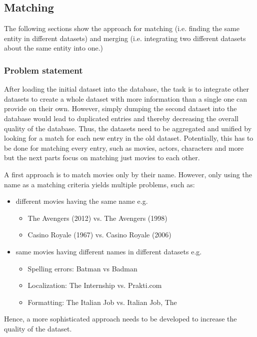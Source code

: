 \subsection{Matching}
\label{subsec_method_matching}

The following sections show the approach for matching (i.e. finding the same entity in different datasets) and merging (i.e. integrating two different datasets about the same entity into one.)

\subsubsection{Problem statement}
After loading the initial dataset into the database, the task is to integrate other datasets to create a whole dataset with more information than a single one can provide on their own.
However, simply dumping the second dataset into the database would lead to duplicated entries and thereby decreasing the overall quality of the database.
Thus, the datasets need to be aggregated and unified by looking for a match for each new entry in the old dataset.
Potentially, this has to be done for matching every entry, such as movies, actors, characters and more but the next parts focus on matching just movies to each other.

A first approach is to match movies only by their name.
However, only using the name as a matching criteria yields multiple problems, such as:
\begin{itemize}
	\item different movies having the same name e.g.
	\begin{itemize}
        \item The Avengers (2012) vs. The Avengers (1998)
        \item Casino Royale (1967) vs. Casino Royale (2006)
    \end{itemize}
	\item same movies having different names in different datasets e.g.
	\begin{itemize}
        \item Spelling errors: Batman vs Badman
        \item Localization: The Internship vs. Prakti.com
        \item Formatting: The Italian Job vs. Italian Job, The
     \end{itemize}
\end{itemize}
Hence, a more sophisticated approach needs to be developed to increase the quality of the dataset.

